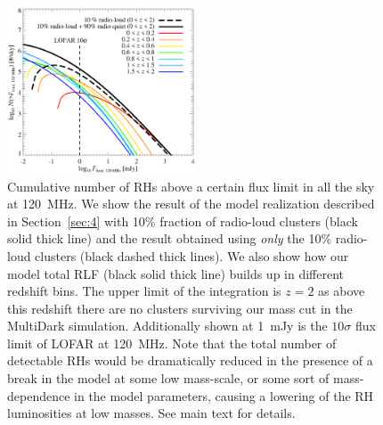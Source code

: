 \documentclass[traditabstract]{aa}
\begin{document}
\begin{figure}[t]
\centering
\includegraphics[width=0.5\textwidth]{figures/RLF_LOFAR_flux.eps}
\caption{Cumulative number of RHs above a certain flux limit in all the sky at 120~MHz. We show the result of the model realization described in Section~\ref{sec:4} with 10\% fraction of radio-loud clusters (black solid thick line) and the result obtained using \emph{only} the 10\% radio-loud clusters (black dashed thick lines). We also show how our model total RLF (black solid thick line) builds up in different redshift bins.
The upper limit of the integration is $z = 2$ as above this redshift there are no clusters surviving our mass cut in the MultiDark simulation. Additionally shown at 1~mJy is the $10\sigma$ flux limit of LOFAR at 120~MHz. Note that the total number of detectable RHs would be dramatically reduced in the presence of a break in the model at some low mass-scale, or some sort of mass-dependence in the model parameters, causing a lowering of the RH luminosities at low masses. See main text for details.
}
\label{fig:RLF_120_flux}
\end{figure}
\end{document}
